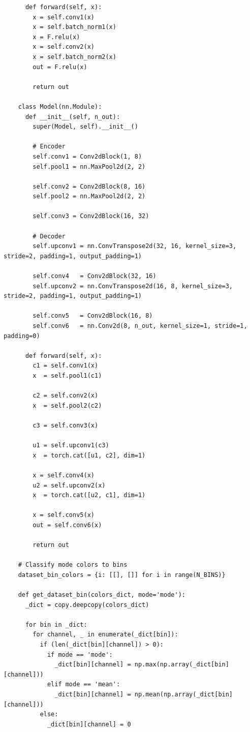 \begin{longlisting}
\begin{verbatim}
      def forward(self, x):
        x = self.conv1(x)
        x = self.batch_norm1(x)
        x = F.relu(x)
        x = self.conv2(x)
        x = self.batch_norm2(x)
        out = F.relu(x)
      
        return out

    class Model(nn.Module):
      def __init__(self, n_out):
        super(Model, self).__init__()
        
        # Encoder
        self.conv1 = Conv2dBlock(1, 8)
        self.pool1 = nn.MaxPool2d(2, 2)

        self.conv2 = Conv2dBlock(8, 16)
        self.pool2 = nn.MaxPool2d(2, 2)

        self.conv3 = Conv2dBlock(16, 32)

        # Decoder
        self.upconv1 = nn.ConvTranspose2d(32, 16, kernel_size=3, stride=2, padding=1, output_padding=1)

        self.conv4   = Conv2dBlock(32, 16)
        self.upconv2 = nn.ConvTranspose2d(16, 8, kernel_size=3, stride=2, padding=1, output_padding=1)

        self.conv5   = Conv2dBlock(16, 8)
        self.conv6   = nn.Conv2d(8, n_out, kernel_size=1, stride=1, padding=0)
        
      def forward(self, x):
        c1 = self.conv1(x)
        x  = self.pool1(c1)

        c2 = self.conv2(x)
        x  = self.pool2(c2)

        c3 = self.conv3(x)

        u1 = self.upconv1(c3)
        x  = torch.cat([u1, c2], dim=1)

        x = self.conv4(x)
        u2 = self.upconv2(x)
        x  = torch.cat([u2, c1], dim=1)

        x = self.conv5(x)
        out = self.conv6(x)

        return out

    # Classify mode colors to bins
    dataset_bin_colors = {i: [[], []] for i in range(N_BINS)}

    def get_dataset_bin(colors_dict, mode='mode'):
      _dict = copy.deepcopy(colors_dict)

      for bin in _dict:
        for channel, _ in enumerate(_dict[bin]):
          if (len(_dict[bin][channel]) > 0):
            if mode == 'mode':
              _dict[bin][channel] = np.max(np.array(_dict[bin][channel]))
            elif mode == 'mean':
              _dict[bin][channel] = np.mean(np.array(_dict[bin][channel]))
          else:
            _dict[bin][channel] = 0


\end{verbatim}
\end{longlisting}
